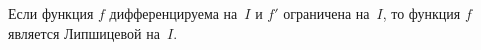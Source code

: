 
    Если функция $f$ дифференцируема на~$I$ и $f'$ ограничена на~$I$, то функция $f$ является Липшицевой на~$I$.
